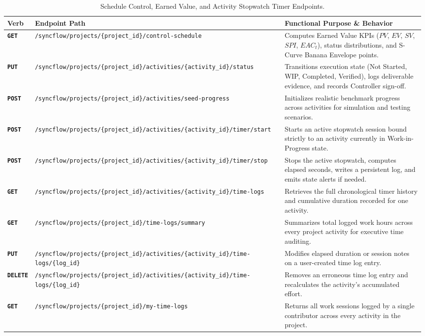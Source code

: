 \begin{table}[H]
\centering
\small
\setlength{\tabcolsep}{5pt}
\renewcommand{\arraystretch}{1.28}
\caption*{Schedule Control, Earned Value, and Activity Stopwatch Timer Endpoints.}
\vspace{-2pt}
\begin{tabularx}{\textwidth}{p{1.3cm} >{\raggedright\arraybackslash}p{6.0cm} X}
\toprule
\textbf{Verb} & \textbf{Endpoint Path} & \textbf{Functional Purpose \& Behavior} \\
\midrule
\textbf{\texttt{GET}} & \texttt{/syncflow/projects/\{project\_id\}/\allowbreak control-schedule} & Computes Earned Value KPIs ($PV$, $EV$, $SV$, $SPI$, $EAC_t$), status distributions, and S-Curve Banana Envelope points. \\
\textbf{\texttt{PUT}} & \texttt{/syncflow/projects/\{project\_id\}/\allowbreak activities/\{activity\_id\}/\allowbreak status} & Transitions execution state (Not Started, WIP, Completed, Verified), logs deliverable evidence, and records Controller sign-off. \\
\textbf{\texttt{POST}} & \texttt{/syncflow/projects/\{project\_id\}/\allowbreak activities/seed-progress} & Initializes realistic benchmark progress across activities for simulation and testing scenarios. \\
\textbf{\texttt{POST}} & \texttt{/syncflow/projects/\{project\_id\}/\allowbreak activities/\{activity\_id\}/\allowbreak timer/start} & Starts an active stopwatch session bound strictly to an activity currently in Work-in-Progress state. \\
\textbf{\texttt{POST}} & \texttt{/syncflow/projects/\{project\_id\}/\allowbreak activities/\{activity\_id\}/\allowbreak timer/stop} & Stops the active stopwatch, computes elapsed seconds, writes a persistent log, and emits state alerts if needed. \\
\textbf{\texttt{GET}} & \texttt{/syncflow/projects/\{project\_id\}/\allowbreak activities/\{activity\_id\}/\allowbreak time-logs} & Retrieves the full chronological timer history and cumulative duration recorded for one activity. \\
\textbf{\texttt{GET}} & \texttt{/syncflow/projects/\{project\_id\}/\allowbreak time-logs/summary} & Summarizes total logged work hours across every project activity for executive time auditing. \\
\textbf{\texttt{PUT}} & \texttt{/syncflow/projects/\{project\_id\}/\allowbreak activities/\{activity\_id\}/\allowbreak time-logs/\{log\_id\}} & Modifies elapsed duration or session notes on a user-created time log entry. \\
\textbf{\texttt{DELETE}} & \texttt{/syncflow/projects/\{project\_id\}/\allowbreak activities/\{activity\_id\}/\allowbreak time-logs/\{log\_id\}} & Removes an erroneous time log entry and recalculates the activity's accumulated effort. \\
\textbf{\texttt{GET}} & \texttt{/syncflow/projects/\{project\_id\}/\allowbreak my-time-logs} & Returns all work sessions logged by a single contributor across every activity in the project. \\
\bottomrule
\end{tabularx}
\end{table}

